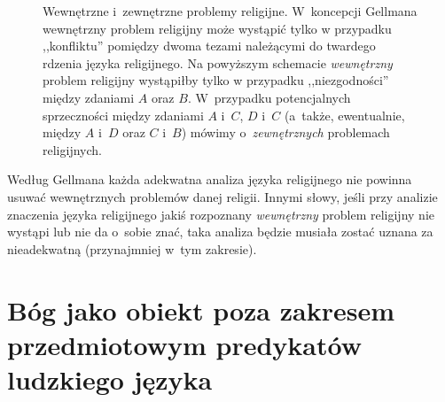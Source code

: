 \begin{figure}[H]
\begin{center}

\caption[Wewnętrzne i~zewnętrzne problemy religijne według Gellmana]{Wewnętrzne i~zewnętrzne problemy religijne. W~koncepcji Gellmana wewnętrzny problem religijny może wystąpić tylko w przypadku ,,konfliktu'' pomiędzy dwoma tezami należącymi do twardego rdzenia języka religijnego. Na powyższym schemacie \textit{wewnętrzny} problem religijny wystąpiłby tylko w przypadku ,,niezgodności'' między zdaniami $A$ oraz $B$. W~przypadku potencjalnych sprzeczności między zdaniami $A$ i~$C$, $D$ i~$C$ (a~także, ewentualnie, między $A$ i~$D$ oraz $C$ i~$B$) mówimy o~\textit{zewnętrznych} problemach religijnych.}\label{sil-gell-prob}
\end{center}
\end{figure}

Według Gellmana każda adekwatna analiza języka religijnego nie powinna usuwać wewnętrznych problemów danej religii. Innymi słowy, jeśli przy analizie znaczenia języka religijnego jakiś rozpoznany \textit{wewnętrzny} problem religijny nie wystąpi lub nie da o~sobie znać, taka analiza będzie musiała zostać uznana za nieadekwatną (przynajmniej w~tym zakresie).


\section{Bóg jako obiekt poza zakresem przedmiotowym predykatów ludzkiego języka}

